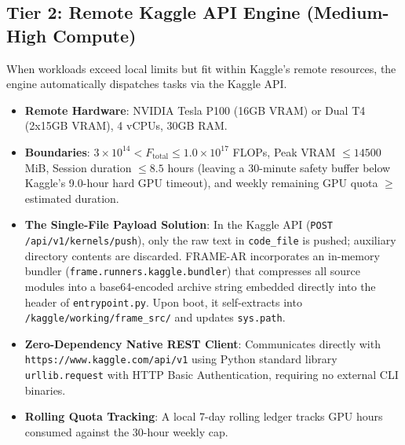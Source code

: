 \documentclass[11pt,a4paper]{article}
\begin{document}
\subsection{Tier 2: Remote Kaggle API Engine (Medium-High Compute)}
When workloads exceed local limits but fit within Kaggle's remote resources, the engine automatically dispatches tasks via the Kaggle API.
\begin{itemize}[noitemsep]
    \item \textbf{Remote Hardware}: NVIDIA Tesla P100 (16GB VRAM) or Dual T4 (2x15GB VRAM), 4 vCPUs, 30GB RAM.
    \item \textbf{Boundaries}: $3 \times 10^{14} < F_{\text{total}} \le 1.0 \times 10^{17}$ FLOPs, Peak VRAM $\le 14500$ MiB, Session duration $\le 8.5$ hours (leaving a 30-minute safety buffer below Kaggle's 9.0-hour hard GPU timeout), and weekly remaining GPU quota $\ge$ estimated duration.
    \item \textbf{The Single-File Payload Solution}: In the Kaggle API (\texttt{POST /api/v1/kernels/push}), only the raw text in \texttt{code\_file} is pushed; auxiliary directory contents are discarded. FRAME-AR incorporates an in-memory bundler (\texttt{frame.runners.kaggle.bundler}) that compresses all source modules into a base64-encoded archive string embedded directly into the header of \texttt{entrypoint.py}. Upon boot, it self-extracts into \texttt{/kaggle/working/frame\_src/} and updates \texttt{sys.path}.
    \item \textbf{Zero-Dependency Native REST Client}: Communicates directly with \texttt{https://www.kaggle.com/api/v1} using Python standard library \texttt{urllib.request} with HTTP Basic Authentication, requiring no external CLI binaries.
    \item \textbf{Rolling Quota Tracking}: A local 7-day rolling ledger tracks GPU hours consumed against the 30-hour weekly cap.
\end{itemize}
\end{document}
